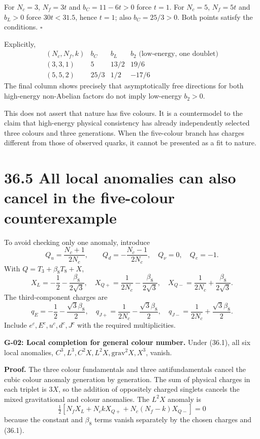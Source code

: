 \documentclass[
  11pt,
  oneside]{book}
\begin{document}
For \(N_c=3\), \(N_f=3t\) and \(b_C=11-6t>0\) force \(t=1\). For
\(N_c=5\), \(N_f=5t\) and \(b_L>0\) force \(30t<31.5\), hence \(t=1\);
also \(b_C=25/3>0\). Both points satisfy the conditions. \(\square\)

Explicitly, \[
\begin{array}{c|ccc}
(N_c,N_f,k)&b_C&b_L&b_2\text{ (low-energy, one doublet)}\\\hline
(3,3,1)&5&13/2&19/6\\
(5,5,2)&25/3&1/2&-17/6
\end{array}
\tag{36.7}
\] The final column shows precisely that asymptotically free directions
for both high-energy non-Abelian factors do not imply low-energy
\(b_2>0\).

This does not assert that nature has five colours. It is a countermodel
to the claim that high-energy physical consistency has already
independently selected three colours and three generations. When the
five-colour branch has charges different from those of observed quarks,
it cannot be presented as a fit to nature.

\section{36.5 All local anomalies can also cancel in the five-colour
counterexample}

To avoid checking only one anomaly, introduce \[
Q_u=\frac{N_c+1}{2N_c},\qquad
Q_d=-\frac{N_c-1}{2N_c},\quad Q_\nu=0,\quad Q_e=-1.
\] With \(Q=T_3+\beta_8T_8+X\), \[
X_L=-\frac12-\frac{\beta_8}{2\sqrt3},\quad
X_{Q+}=\frac1{2N_c}-\frac{\beta_8}{2\sqrt3},\quad
X_{Q-}=\frac1{2N_c}+\frac{\beta_8}{2\sqrt3}.
\] The third-component charges are \[
q_E=-\frac12-\frac{\sqrt3\beta_8}{2},\quad
q_{J+}=\frac1{2N_c}-\frac{\sqrt3\beta_8}{2},\quad
q_{J-}=\frac1{2N_c}+\frac{\sqrt3\beta_8}{2}.
\] Include \(e^c,E^c,u^c,d^c,J^c\) with the required multiplicities.

\label{g-02}{}

\textbf{G-02: Local completion for general colour number.} Under (36.1),
all six local anomalies, \(C^3,L^3,C^2X,L^2X,\mathrm{grav}^2X,X^3\),
vanish.

\textbf{Proof.} The three colour fundamentals and three antifundamentals
cancel the cubic colour anomaly generation by generation. The sum of
physical charges in each triplet is \(3X\), so the addition of
oppositely charged singlets cancels the mixed gravitational and colour
anomalies. The \(L^2X\) anomaly is \[
\tfrac12[N_fX_L+N_c kX_{Q+}+N_c(N_f-k)X_{Q-}]=0
\] because the constant and \(\beta_8\) terms vanish separately by the
chosen charges and (36.1).
\end{document}
